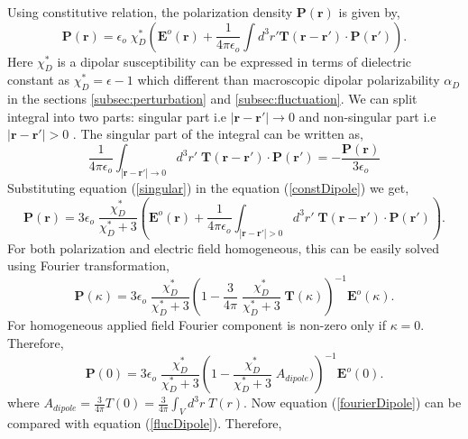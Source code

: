 Using constitutive relation, the polarization density $\textbf{P}(\textbf{r})$ is given by,
\begin{equation}
\textbf{P}(\textbf{r}) = \epsilon_o\; \chi^*_D \left(\textbf{E}^o(\textbf{r}) + \frac{1}{4\pi\epsilon_o} \int d^3r' \textbf{T}(\textbf{r}-\textbf{r}')\cdot {\textbf{P}(\textbf{r}')}\right).
\label{constDipole}
\end{equation}
Here $\chi^*_D$ is a dipolar susceptibility can be expressed in terms of dielectric constant as $ \chi^*_D = \epsilon - 1$ which different than macroscopic dipolar polarizability $\alpha_D$ in the sections \ref{subsec:perturbation} and \ref{subsec:fluctuation}. We can split integral into two parts: singular part i.e $|\textbf{r}-\textbf{r}'|\rightarrow 0 $ and non-singular part i.e $|\textbf{r}-\textbf{r}'| > 0 $ . The singular part of the integral can be written as,\cite{NeumannI83, Jackson98}
\begin{equation}
\frac{1}{4\pi\epsilon_o} \int_{|\textbf{r}-\textbf{r}'| \rightarrow 0} d^3r'\; \textbf{T}(\textbf{r}-\textbf{r}')\cdot {\textbf{P}(\textbf{r}')} = - \frac{\textbf{P}(\textbf{r})}{3\epsilon_o}
\label{singular}
\end{equation}
Substituting equation (\ref{singular}) in the equation (\ref{constDipole}) we get,
\begin{equation}
\textbf{P}(\textbf{r}) = 3 \epsilon_o\; \frac{\chi^*_D}{\chi^*_D + 3} \left(\textbf{E}^o(\textbf{r}) + \frac{1}{4\pi\epsilon_o} \int_{|\textbf{r}-\textbf{r}'| > 0} d^3r'\; \textbf{T}(\textbf{r}-\textbf{r}')\cdot {\textbf{P}(\textbf{r}')}\right).
\end{equation}
For both polarization and electric field homogeneous, this can be easily solved using Fourier transformation, 
\begin{equation}
\textbf{P}(\kappa) = 3 \epsilon_o\; \frac{\chi^*_D}{\chi^*_D + 3} \left(1-  \frac{3}{4\pi}\;\frac{\chi^*_D}{\chi^*_D + 3}\; \textbf{T}({\kappa})\right)^{-1}\textbf{E}^o({\kappa}).
\end{equation}
For homogeneous applied field Fourier component is non-zero only if $\kappa = 0$. Therefore,
\begin{equation}
\textbf{P}(0) = 3 \epsilon_o\; \frac{\chi^*_D}{\chi^*_D + 3} \left(1-  \frac{\chi^*_D}{\chi^*_D + 3}\; A_{dipole})\right)^{-1}\textbf{E}^o({0}).
\label{fourierDipole}
\end{equation}
where $A_{dipole}=\frac{3}{4\pi}T(0) = \frac{3}{4\pi} \int_V d^3r\;T(r)$. Now  equation (\ref{fourierDipole}) can be compared with equation (\ref{flucDipole}). Therefore,
